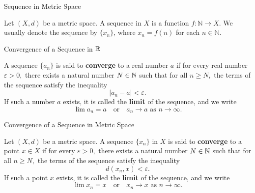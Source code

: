 \documentclass[12pt, a4paper]{article}
\begin{document}
\FrontPage
\Large


\begin{heading}
    Sequence in Metric Space
\end{heading}

\vspace{10pt}

\begin{definition}
    Let $(X, d)$ be a metric space. A sequence in $X$ is a function $f: \mathbb{N} \to X$. We usually denote the sequence by $\{x_n\}$, where $x_n = f(n)$ for each $n \in \mathbb{N}$.
\end{definition}

\clearpage


\begin{heading}
	Convergence of a Sequence in $\mathbb{R}$
\end{heading}

\vspace{10pt}

\begin{definition}
	A sequence $\{a_n\}$ is said to \textbf{converge} to a real number $a$ if for every real number $\varepsilon > 0,$ there exists a natural number $N \in \mathbb{N}$ such that for all $n \geq N,$ the terms of the sequence satisfy the inequality 
	\[
	|a_n - a| < \varepsilon.
	\]
	If such a number $a$ exists, it is called the \textbf{limit} of the sequence, and we write
	\[
	\lim a_n = a \quad \text{or} \quad a_n \to a \text{ as } n \to \infty.
	\]
\end{definition}

\clearpage

\begin{heading}
    Convergence of a Sequence in Metric Space
\end{heading}

\vspace{10pt}

\begin{definition}
    Let $(X, d)$ be a metric space. A sequence $\{x_n\}$ in $X$ is said to \textbf{converge} to a point $x \in X$ if for every $\varepsilon > 0,$ there exists a natural number $N \in \mathbb{N}$ such that for all $n \geq N,$ the terms of the sequence satisfy the inequality
    \[
    d(x_n, x) < \varepsilon.
    \]
    If such a point $x$ exists, it is called the \textbf{limit} of the sequence, and we write
    \[
    \lim x_n = x \quad \text{or} \quad x_n \to x \text{ as } n \to \infty.
    \]
\end{definition}
\end{document}

